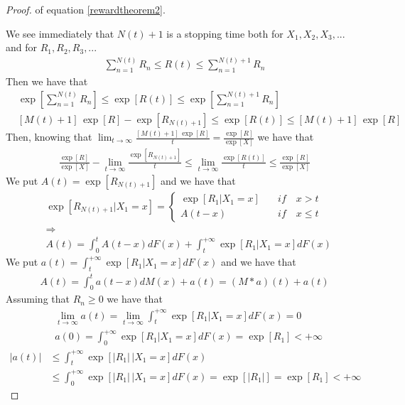 \begin{proof} of equation \ref{rewardtheorem2}.

	We see immediately that $N(t)+1$ is a stopping time both for $X_1,X_2,X_3,...$ and for $R_1,R_2,R_3,..$.
	\begin{align*}
		\sum_{n=1}^{N(t)}R_n \leq R(t) \leq \sum_{n=1}^{N(t)+1}R_n
	\end{align*}
	Then we have that
	\begin{align*}
		& \exp\left[\sum_{n=1}^{N(t)}R_n\right] \leq \exp[R(t)] \leq \exp\left[\sum_{n=1}^{N(t)+1}R_n\right]
		\\ & [M(t)+1] \, \exp[R]-\exp[R_{N(t)+1}] \leq \exp[R(t)] \leq [M(t)+1] \, \exp[R]
	\end{align*}
	Then, knowing that $\lim_{t \to \infty} \frac{[M(t)+1] \, \exp[R]}{t} = \frac {\exp[R]}{\exp[X]} $ we have that
	\begin{align*}
		\frac {\exp[R]}{\exp[X]} - \lim_{t \to \infty} \frac{\exp[R_{N(t)+1}]}{t} \leq \lim_{t \to \infty} \frac{\exp[R(t)]}{t} \leq \frac{\exp[R]}{\exp[X]}
	\end{align*}
	We put $A(t)=\exp[R_{N(t)+1}]$ and we have that
	\begin{align*}
		& \exp[R_{N(t)+1}|X_1=x]=
			\begin{cases}
				\exp[R_1|X_1=x] \quad & if \quad x>t
				\\ A(t-x) \quad & if \quad x \leq t
			\end{cases}
		\\ & \Rightarrow
		\\ & A(t)=\int_{0}^{t}A(t-x)dF(x)+\int_{t}^{+\infty}\exp[R_1|X_1=x]dF(x)
	\end{align*}
	We put $a(t)=\int_{t}^{+\infty}\exp[R_1|X_1=x]dF(x)$ and we have that
	\begin{align*}
		A(t)=\int_{0}^{t}a(t-x)dM(x)+a(t)=(M \ast a) (t)+a(t)
	\end{align*}
	Assuming that $R_n \geq 0$ we have that
	\begin{align*}
		& \lim_{t \to \infty}a(t) = \lim_{t \to \infty}\int_{t}^{+\infty}\exp[R_1|X_1=x]dF(x)=0
		\\ & a(0)=\int_{0}^{+\infty}\exp[R_1|X_1=x]dF(x)=\exp[R_1]<+\infty
	\end{align*}
	\begin{align*}
		|a(t)| & \leq \int_{t}^{+\infty}\exp\left[|R_1|\,|X_1=x\right]dF(x)
		\\ & \leq \int_{0}^{+\infty}\exp\left[|R_1|\,|X_1=x\right]dF(x) = \exp\left[|R_1|\right]=\exp[R_1]<+\infty
	\end{align*}

\end{proof}
